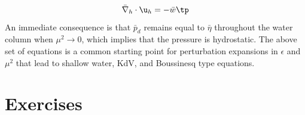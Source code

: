 \documentclass[graybox,envcountchap,sectrefs,final]{svmonodo}
\begin{document}
\begin{equation}
\label{scale:surfacewave:kinbott3}
\bar\nabla_h\cdot\u_h =-\bar w\tp
\end{equation}
An immediate consequence is that $\bar p_d$ remains equal to $\bar \eta$ throughout the water column when $\mu^2\rightarrow 0$, which implies that the pressure
is hydrostatic. The above set of equations is a common  starting point for
perturbation expansions in $\epsilon$ and $\mu^2$ that lead to shallow water,
KdV, and Boussinesq type equations.



\section{Exercises}
\end{document}
